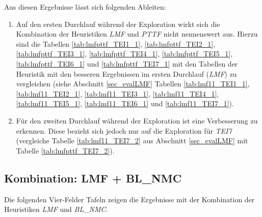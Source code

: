 \begin{multicols}{2}
\columnbreak
{}
\end{multicols}
\noindent
Aus diesen Ergebnisse lässt sich folgenden Ableiten:
\begin{enumerate}
\item Auf den ersten Durchlauf während der Exploration wirkt sich die Kombination der Heuristiken \emph{LMF} und \emph{PTTF} nicht nennenswert aus. Hierzu sind die Tabellen \ref{tab:lmfpttf_TEI1_1}, \ref{tab:lmfpttf_TEI2_1}, \ref{tab:lmfpttf_TEI3_1}, \ref{tab:lmfpttf_TEI4_1}, \ref{tab:lmfpttf_TEI5_1}, \ref{tab:lmfpttf_TEI6_1} und \ref{tab:lmfpttf_TEI7_1} mit den Tabellen der Heuristik mit den besseren Ergebnissen im ersten Durchlauf (\emph{LMF}) zu vergleichen (siehe Abschnitt \ref{sec_evalLMF} Tabellen \ref{tab:lmf11_TEI1_1}, \ref{tab:lmf11_TEI2_1}, \ref{tab:lmf11_TEI3_1}, \ref{tab:lmf11_TEI4_1}, \ref{tab:lmf11_TEI5_1}, \ref{tab:lmf11_TEI6_1} und \ref{tab:lmf11_TEI7_1}).
\item Für den zweiten Durchlauf während der Exploration ist eine Verbesserung zu erkennen. Diese bezieht sich jedoch nur auf die Exploration für \emph{TEI7} (vergleiche Tabelle \ref{tab:lmf11_TEI7_2} aus Abschnitt \ref{sec_evalLMF} mit Tabelle \ref{tab:lmfpttf_TEI7_2}).
\end{enumerate}

\subsection{Kombination: LMF + BL\_NMC}\label{sec_evalLMFBLNMC}
Die folgenden Vier-Felder Tafeln zeigen die Ergebnisse mit der Kombination der Heuristiken \emph{LMF} und \emph{BL\_NMC}.
\begin{multicols}{3}
\columnbreak
{}\columnbreak
{}
\end{multicols}

\begin{multicols}{2}
\columnbreak
{}
\end{multicols}

